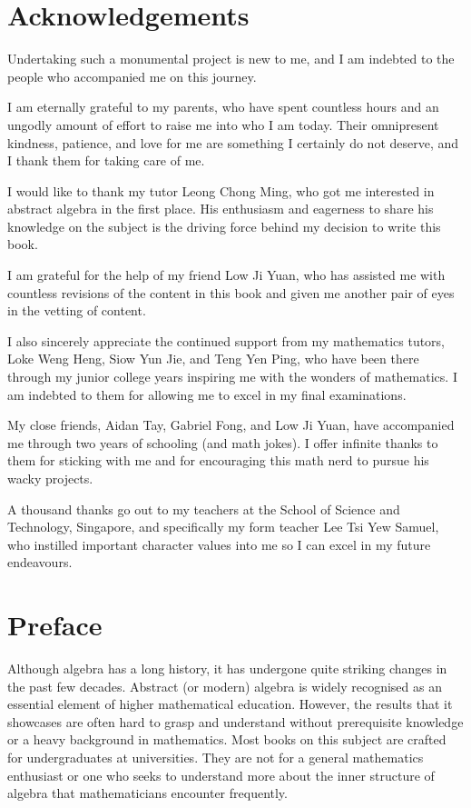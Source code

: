 \newpage

\createtoc

\chapter{Acknowledgements}
Undertaking such a monumental project is new to me, and I am indebted to the people who accompanied me on this journey.

I am eternally grateful to my parents, who have spent countless hours and an ungodly amount of effort to raise me into who I am today. Their omnipresent kindness, patience, and love for me are something I certainly do not deserve, and I thank them for taking care of me.

I would like to thank my tutor Leong Chong Ming, who got me interested in abstract algebra in the first place. His enthusiasm and eagerness to share his knowledge on the subject is the driving force behind my decision to write this book.

I am grateful for the help of my friend Low Ji Yuan, who has assisted me with countless revisions of the content in this book and given me another pair of eyes in the vetting of content.

I also sincerely appreciate the continued support from my mathematics tutors, Loke Weng Heng, Siow Yun Jie, and Teng Yen Ping, who have been there through my junior college years inspiring me with the wonders of mathematics. I am indebted to them for allowing me to excel in my final examinations.

My close friends, Aidan Tay, Gabriel Fong, and Low Ji Yuan, have accompanied me through two years of schooling (and math jokes). I offer infinite thanks to them for sticking with me and for encouraging this math nerd to pursue his wacky projects.

A thousand thanks go out to my teachers at the School of Science and Technology, Singapore, and specifically my form teacher Lee Tsi Yew Samuel, who instilled important character values into me so I can excel in my future endeavours.

\chapter{Preface}
Although algebra has a long history, it has undergone quite striking changes in the past few decades. Abstract (or modern) algebra is widely recognised as an essential element of higher mathematical education. However, the results that it showcases are often hard to grasp and understand without prerequisite knowledge or a heavy background in mathematics. Most books on this subject are crafted for undergraduates at universities. They are not for a general mathematics enthusiast or one who seeks to understand more about the inner structure of algebra that mathematicians encounter frequently.

